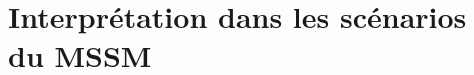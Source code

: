 \section{Interprétation dans les scénarios du MSSM}\label{chapter-HTT_analysis-section-signal_extraction-benchmarks}


